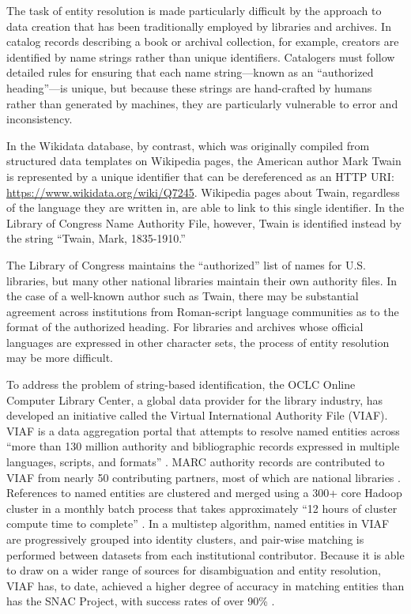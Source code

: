 \documentclass[sigconf]{acmart}
\begin{document}
The task of entity resolution is made particularly difficult by the approach to data creation that has been traditionally employed by libraries and archives. In catalog records describing a book or archival collection, for example, creators are identified by name strings rather than unique identifiers. Catalogers must follow detailed rules for ensuring that each name string---known as an ``authorized heading''---is unique, but because these strings are hand-crafted by humans rather than generated by machines, they are particularly vulnerable to error and inconsistency.

In the Wikidata database, by contrast, which was originally compiled from structured data templates on Wikipedia pages, the American author Mark Twain is represented by a unique identifier that can be dereferenced as an HTTP URI: \url{https://www.wikidata.org/wiki/Q7245}. Wikipedia pages about Twain, regardless of the language they are written in, are able to link to this single identifier. In the Library of Congress Name Authority File, however, Twain is identified instead by the string ``Twain, Mark, 1835-1910.''

The Library of Congress maintains the ``authorized'' list of names for U.S. libraries, but many other national libraries maintain their own authority files. In the case of a well-known author such as Twain, there may be substantial agreement across institutions from Roman-script language communities as to the format of the authorized heading. For libraries and archives whose official languages are expressed in other character sets, the process of entity resolution may be more difficult.

To address the problem of string-based identification, the OCLC Online Computer Library Center, a global data provider for the library industry, has developed an initiative called the Virtual International Authority File (VIAF). VIAF is a data aggregation portal that attempts to resolve named entities across ``more than 130 million authority and bibliographic records expressed in multiple languages, scripts, and formats'' \cite[p.~1]{tH14}. MARC authority records are contributed to VIAF from nearly 50 contributing partners, most of which are national libraries \cite{tH14}. References to named entities are clustered and merged using a 300+ core Hadoop cluster in a monthly batch process that takes approximately ``12 hours of cluster compute time to complete'' \cite[p.~2]{tH14}. In a multistep algorithm, named entities in VIAF are progressively grouped into identity clusters, and pair-wise matching is performed between datasets from each institutional contributor. Because it is able to draw on a wider range of sources for disambiguation and entity resolution, VIAF has, to date, achieved a higher degree of accuracy in matching entities than has the SNAC Project, with success rates of over 90\% \cite{tH14}.
\end{document}
